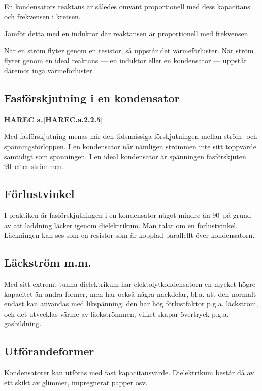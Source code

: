 En kondensators reaktans är således omvänt proportionell med dess kapacitans
och frekvensen i kretsen.

Jämför detta med en induktor där reaktansen är proportionell med frekvensen.

När en ström flyter genom en resistor, så uppstår det värmeförluster. När ström
flyter genom en ideal reaktans --- en induktor eller en kondensator --- uppstår
däremot inga värmeförluster.

\subsection{Fasförskjutning i en kondensator}
\textbf{HAREC a.\ref{HAREC.a.2.2.5}\label{myHAREC.a.2.2.5}}

Med fasförskjutning menas här den tidsmässiga förskjutningen mellan ström- och
spänningsförloppen. I en kondensator når nämligen strömmen inte sitt toppvärde
samtidigt som spänningen.
I en ideal kondensator är spänningen fasförskjuten 90\degree~efter strömmen.

\subsection{Förlustvinkel}

I praktiken är fasförskjutningen i en kondensator något mindre än 90\degree~på
grund av att laddning läcker igenom dielektrikum. Man talar om en förlustvinkel.
Läckningen kan ses som en resistor som är kopplad parallellt över kondensatorn.

\subsection{Läckström m.m.}

Med sitt extremt tunna dielektrikum har elektolytkondensatorn en mycket högre
kapacitet än andra former, men har också några nackdelar, bl.a. att den normalt
endast kan användas med likspänning, den har hög förlustfaktor p.g.a. läckström,
och det utvecklas värme av läckströmmen, vilket skapar övertryck p.g.a.
gasbildning.

\subsection{Utförandeformer}

Kondensatorer kan utföras med fast kapacitansvärde.
Dielektrikum består då av ett skikt av glimmer, impregnerat papper osv.

